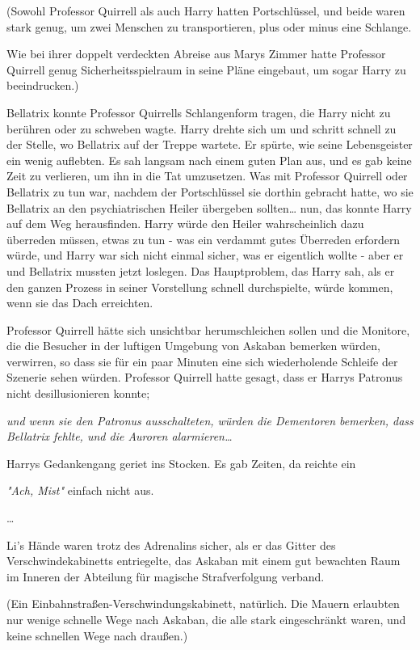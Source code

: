 {(Sowohl Professor Quirrell als auch Harry hatten Portschlüssel, und beide waren stark genug, um zwei Menschen zu transportieren, plus oder minus eine Schlange.

Wie bei ihrer doppelt verdeckten Abreise aus Marys Zimmer hatte Professor Quirrell genug Sicherheitsspielraum in seine Pläne eingebaut, um sogar Harry zu beeindrucken.)

Bellatrix konnte Professor Quirrells Schlangenform tragen, die Harry nicht zu berühren oder zu schweben wagte. Harry drehte sich um und schritt schnell zu der Stelle, wo Bellatrix auf der Treppe wartete. Er spürte, wie seine Lebensgeister ein wenig auflebten. Es sah langsam nach einem guten Plan aus, und es gab keine Zeit zu verlieren, um ihn in die Tat umzusetzen. Was mit Professor Quirrell oder Bellatrix zu tun war, nachdem der Portschlüssel sie dorthin gebracht hatte, wo sie Bellatrix an den psychiatrischen Heiler übergeben sollten… nun, das konnte Harry auf dem Weg herausfinden. Harry würde den Heiler wahrscheinlich dazu überreden müssen, etwas zu tun - was ein verdammt gutes Überreden erfordern würde, und Harry war sich nicht einmal sicher, was er eigentlich wollte - aber er und Bellatrix mussten jetzt loslegen. Das Hauptproblem, das Harry sah, als er den ganzen Prozess in seiner Vorstellung schnell durchspielte, würde kommen, wenn sie das Dach erreichten.

Professor Quirrell hätte sich unsichtbar herumschleichen sollen und die Monitore, die die Besucher in der luftigen Umgebung von Askaban bemerken würden, verwirren, so dass sie für ein paar Minuten eine sich wiederholende Schleife der Szenerie sehen würden. Professor Quirrell hatte gesagt, dass er Harrys Patronus nicht desillusionieren konnte;

\emph{und wenn sie den Patronus ausschalteten, würden die Dementoren bemerken, dass Bellatrix fehlte, und die Auroren alarmieren…}

Harrys Gedankengang geriet ins Stocken. Es gab Zeiten, da reichte ein

\emph{"Ach, Mist"} einfach nicht aus.

…

Li's Hände waren trotz des Adrenalins sicher, als er das Gitter des Verschwindekabinetts entriegelte, das Askaban mit einem gut bewachten Raum im Inneren der Abteilung für magische Strafverfolgung verband.

(Ein Einbahnstraßen-Verschwindungskabinett, natürlich. Die Mauern erlaubten nur wenige schnelle Wege nach Askaban, die alle stark eingeschränkt waren, und keine schnellen Wege nach draußen.)

}
